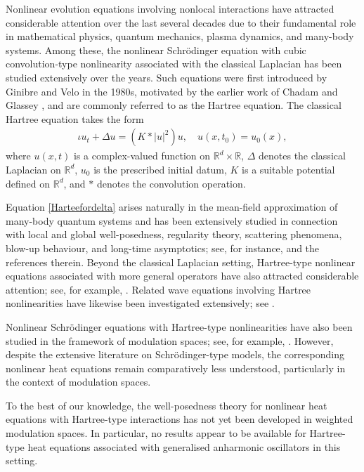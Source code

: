 \documentclass[12pt,reqno,a4paper]{amsart}
\numberwithin{equation}{section}
\theoremstyle{plain}
\theoremstyle{definition}
\theoremstyle{remark}
\begin{document}
Nonlinear evolution equations involving nonlocal interactions have attracted considerable attention over the last several decades due to their fundamental role in mathematical physics, quantum mechanics, plasma dynamics, and many-body systems. Among these, the nonlinear Schr\"odinger equation with cubic convolution-type nonlinearity associated with the classical Laplacian has been studied extensively over the years. Such equations were first introduced by Ginibre and Velo \cite{MR562582} in the 1980s, motivated by the earlier work of Chadam and Glassey \cite{MR413843}, and are commonly referred to as the Hartree equation. The classical Hartree equation takes the form
\begin{align}
\label{Harteefordelta}
\iota u_{t}+\Delta u= (K*|u|^{2})u, 
\quad 
u(x,t_{0})=u_{0}(x),
\end{align}
where $u(x,t)$ is a complex-valued function on $\mathbb{R}^{d}\times \mathbb{R}$, $\Delta$ denotes the classical Laplacian on $\mathbb{R}^{d}$, $u_{0}$ is the prescribed initial datum, $K$ is a suitable potential defined on $\mathbb{R}^{d}$, and $*$  denotes the convolution operation.

Equation \eqref{Harteefordelta} arises naturally in the mean-field approximation of many-body quantum systems and has been extensively studied in connection with local and global well-posedness, regularity theory, scattering phenomena, blow-up behaviour, and long-time asymptotics; see, for instance, \cite{MR3195768, MR2002047, MR562582, SHYAM2026} and the references therein. Beyond the classical Laplacian setting, Hartree-type nonlinear equations associated with more general operators have also attracted considerable attention; see, for example, \cite{MR4944042, MR3114821, MR4027018, MR3128411}. Related wave equations involving Hartree nonlinearities have likewise been investigated extensively; see \cite{MR4896856, MR4742454, MR5042184}.

Nonlinear Schr\"odinger equations with Hartree-type nonlinearities have also been studied in the framework of modulation spaces; see, for example, \cite{MR4134386, MR3695957, MR3424616}. However, despite the extensive literature on Schr\"odinger-type models, the corresponding nonlinear heat equations remain comparatively less understood, particularly in the context of modulation spaces.

To the best of our knowledge, the well-posedness theory for nonlinear heat equations with Hartree-type interactions has not yet been developed in weighted modulation spaces. In particular, no results appear to be available for Hartree-type heat equations associated with generalised anharmonic oscillators in this setting.
\end{document}
